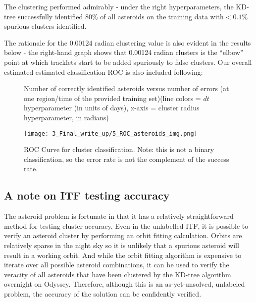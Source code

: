 \documentclass[11pt,letter]{article}
\begin{document}
The clustering performed admirably - under the right hyperparameters, the KD-tree successfully identified 80\% of all asteroids on the training data with$ <0.1\%$ spurious clusters identified.

The rationale for the 0.00124 radian clustering value is also evident in the results below - the right-hand graph shows that 0.00124 radian clusters is the ``elbow'' point at which tracklets start to be added spuriously to false clusters.  Our overall estimated estimated classification ROC is also included following:
\begin{figure}[!hbp]%
    \centering
    \qquad
    \caption{Number of correctly identified asteroids versus number of errors (at one region/time of the provided training set)\newline(line colors = $dt$ hyperparameter (in units of days), x-axis = cluster radius hyperparameter, in radians)}%
    \label{fig:accuracy}%
\end{figure}
\begin{figure}[!hbp]%
    \centering
    \texttt{[image: 3\_Final\_write\_up/5\_ROC\_asteroids\_img.png]}
    \caption{ROC Curve for cluster classification.  Note: this is not a binary classification, so the error rate is not the complement of the success rate.}%
    \label{fig:roc}%
\end{figure}
\subsection*{A note on ITF testing accuracy}
The asteroid problem is fortunate in that it has a relatively straightforward method for testing cluster accuracy.  Even in the unlabelled ITF, it is possible to verify an asteroid cluster by performing an orbit fitting calculation.  Orbits are relatively sparse in the night sky so it is unlikely that a spurious asteroid will result in a working orbit.  And while the orbit fitting algorithm is expensive to iterate over all possible asteroid combinations, it can be used to verify the veracity of all asteroids that have been clustered by the KD-tree algorithm overnight on Odyssey.\newline
Therefore, although this is an as-yet-unsolved, unlabeled problem, the accuracy of the solution can be confidently verified.
\end{document}
